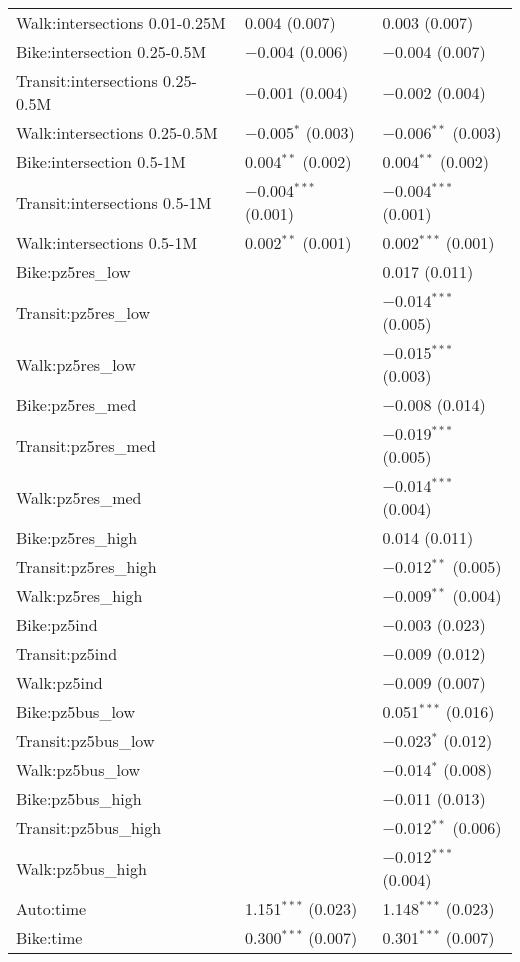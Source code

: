 \begin{longtabu}{lll}
 Walk:intersections 0.01-0.25M & 0.004 (0.007) & 0.003 (0.007) \\ 
 Bike:intersection 0.25-0.5M & $-$0.004 (0.006) & $-$0.004 (0.007) \\ 
 Transit:intersections 0.25-0.5M & $-$0.001 (0.004) & $-$0.002 (0.004) \\ 
 Walk:intersections 0.25-0.5M & $-$0.005$^{*}$ (0.003) & $-$0.006$^{**}$ (0.003) \\ 
 Bike:intersection 0.5-1M & 0.004$^{**}$ (0.002) & 0.004$^{**}$ (0.002) \\ 
 Transit:intersections 0.5-1M & $-$0.004$^{***}$ (0.001) & $-$0.004$^{***}$ (0.001) \\ 
 Walk:intersections 0.5-1M & 0.002$^{**}$ (0.001) & 0.002$^{***}$ (0.001) \\ 
 Bike:pz5res\_low &  & 0.017 (0.011) \\ 
 Transit:pz5res\_low &  & $-$0.014$^{***}$ (0.005) \\ 
 Walk:pz5res\_low &  & $-$0.015$^{***}$ (0.003) \\ 
 Bike:pz5res\_med &  & $-$0.008 (0.014) \\ 
 Transit:pz5res\_med &  & $-$0.019$^{***}$ (0.005) \\ 
 Walk:pz5res\_med &  & $-$0.014$^{***}$ (0.004) \\ 
 Bike:pz5res\_high &  & 0.014 (0.011) \\ 
 Transit:pz5res\_high &  & $-$0.012$^{**}$ (0.005) \\ 
 Walk:pz5res\_high &  & $-$0.009$^{**}$ (0.004) \\ 
 Bike:pz5ind &  & $-$0.003 (0.023) \\ 
 Transit:pz5ind &  & $-$0.009 (0.012) \\ 
 Walk:pz5ind &  & $-$0.009 (0.007) \\ 
 Bike:pz5bus\_low &  & 0.051$^{***}$ (0.016) \\ 
 Transit:pz5bus\_low &  & $-$0.023$^{*}$ (0.012) \\ 
 Walk:pz5bus\_low &  & $-$0.014$^{*}$ (0.008) \\ 
 Bike:pz5bus\_high &  & $-$0.011 (0.013) \\ 
 Transit:pz5bus\_high &  & $-$0.012$^{**}$ (0.006) \\ 
 Walk:pz5bus\_high &  & $-$0.012$^{***}$ (0.004) \\ 
 Auto:time & 1.151$^{***}$ (0.023) & 1.148$^{***}$ (0.023) \\ 
 Bike:time & 0.300$^{***}$ (0.007) & 0.301$^{***}$ (0.007) \\ 

\end{longtabu}
